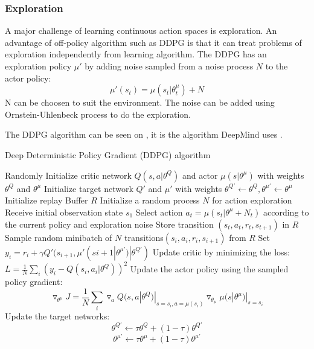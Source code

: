 \subsubsection{Exploration}
A major challenge of learning continuous action spaces is exploration. An advantage of off-policy algorithm such as DDPG is that it can treat problems of exploration independently from learning algorithm. The DDPG has an exploration policy $\mu'$ by adding noise sampled from a noise process $N$ to the actor policy:
\begin{equation}
\mu'(s_t) = \mu(s_t|\theta_t^\mu) + N
\end{equation} 
N can be choosen to suit the environment. The noise can be added using Ornstein-Uhlenbeck process to do the exploration.

The DDPG algorithm can be seen on , it is the algorithm DeepMind uses \cite{DBLP:journals/corr/LillicrapHPHETS15}.  



\begin{algorithm}[H]
	\caption{Deep Deterministic Policy Gradient (DDPG) algorithm}
	\label{algo:DDPG}
	\begin{algorithmic}[H]
		\State Randomly Initialize critic network $Q(s,a|\theta^Q)$ and actor $\mu(s|\theta^\mu)$ with weights $\theta^Q$ and $\theta^\mu$
		\State Initialize target network $Q'$ and $\mu'$ with weights $\theta^{Q'} \leftarrow \theta^{Q}, \theta^{\mu'} \leftarrow \theta^{\mu}$ 
		\State Initialize replay Buffer $R$
			\State Initialize a random process $N$ for action exploration
			\State Receive initial observation state $s_1$
				\State Select action $a_t = \mu(s_t|\theta^\mu + N_t)$ according to the current policy and exploration noise
				\State Store transition $(s_t,a_t,r_t,s_{t+1})$ in $R$
				\State Sample random minibatch of $N$ transitions$(s_i,a_i,r_i,s_{i+1})$ from $R$
				\State Set $y_i = r_i+\gamma Q'(s_{i+1},\mu'(s{i+1}|\theta^{\mu'})|\theta^{Q'})$
				\State Update critic by minimizing the loss: $L=\frac{1}{N} \sum_{i}(y_i - Q(s_i,a_i|\theta^Q))^2$
				\State Update the actor policy using the sampled policy gradient:   
		  			   \begin{equation*}
		  			   \triangledown_{\theta^\mu} J = \frac{1}{N} \sum_{i} \triangledown_{a}Q(s,a|\theta^Q)|_{s=s_i , a=\mu(s_i)} \triangledown_{\theta_\mu}\mu(s|\theta^\mu)|_{s=s_i} 
		  			   \end{equation*}
		  		\State Update the target networks:
		  			   \begin{equation*}
		  			   \theta^{Q'} \leftarrow \tau \theta^Q + (1-\tau)\theta^{Q'} 
		  			   \end{equation*}
		  			   \begin{equation*}
		  			   \theta^{\mu'} \leftarrow \tau \theta^\mu + (1-\tau)\theta^{\mu'} 
		  			   \end{equation*}
			\EndFor
		\EndFor
	\end{algorithmic}
\end{algorithm}


